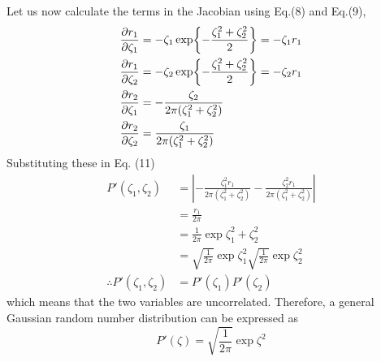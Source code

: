 \documentclass[12pt, oneside]{article}   	%
\begin{document}
Let us now calculate the terms in the Jacobian using Eq.(8) and Eq.(9),
	\begin{align}
	\pdv{r_1}{\zeta_1} &= -\zeta_1 \exp{-\frac{\zeta_1 ^2 + \zeta_2 ^2}{2}} = -\zeta_1 r_1 \\
	\pdv{r_1}{\zeta_2} &= -\zeta_2 \exp{-\frac{\zeta_1 ^2 + \zeta_2 ^2}{2}} = -\zeta_2 r_1 \\
	\pdv{r_2}{\zeta_1} &= -\frac{\zeta_2}{2\pi(\zeta_1 ^2 + \zeta_2 ^2)} \\
	\pdv{r_2}{\zeta_2} &=  \frac{\zeta_1}{2\pi(\zeta_1 ^2 + \zeta_2 ^2)}
	\end{align}
Substituting these in Eq. (11)
	\begin{align} 
	 P'(\zeta_1, \zeta_2) &= \left| -\frac{\zeta_1^2 r_1}{2\pi(\zeta_1 ^2 + \zeta_2 ^2)} -\frac{\zeta_2^2 r_1}{2\pi(\zeta_1 ^2 + \zeta_2 ^2)} \right| \\
	&= \frac{r_1}{2 \pi} \\
	&= \frac{1}{2\pi} \exp{\zeta_1 ^2 + \zeta_2 ^2} \\
	&= \sqrt{\frac{1}{2\pi}} \exp{\zeta_1 ^2} \sqrt{\frac{1}{2\pi}} \exp{\zeta_2 ^2} \\
	\therefore P'(\zeta_1, \zeta_2) &= P'(\zeta_1) P'(\zeta_2)
	\end{align}
which means that the two variables are uncorrelated. Therefore, a general Gaussian random number distribution can be expressed as 
$$ P'(\zeta) = \sqrt{\frac{1}{2\pi}} \exp{\zeta ^2} $$
\end{document}
